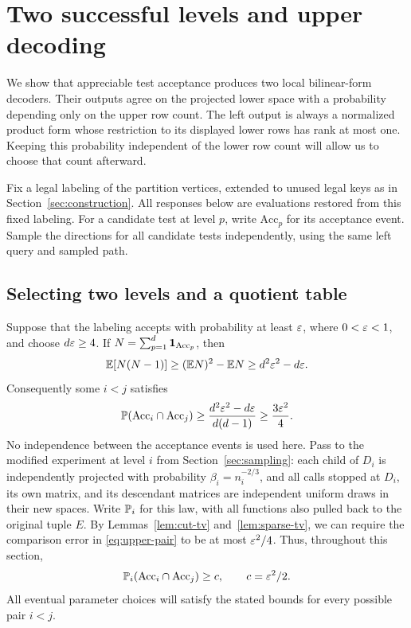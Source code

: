 \section{Two successful levels and upper decoding}\label{sec:upper}

We show that appreciable test acceptance produces two local bilinear-form
decoders.  Their outputs agree on the projected lower space with a probability
depending only on the upper row count.  The left output is always a normalized
product form whose restriction to its displayed lower rows has rank at most
one.  Keeping this probability independent of the lower row count will allow
us to choose that count afterward.

Fix a legal labeling of the partition vertices, extended to unused legal keys
as in Section~\ref{sec:construction}.  All responses below are evaluations
restored from this fixed labeling.  For a candidate test at level $p$, write
$\mathrm{Acc}_p$ for its acceptance event.  Sample the directions for all candidate
tests independently, using the same left query and sampled path.

\subsection{Selecting two levels and a quotient table}

Suppose that the labeling accepts with probability at least $\varepsilon$, where
$0<\varepsilon<1$, and choose $d\varepsilon\ge4$.  If
$N=\sum_{p=1}^d\mathbf 1_{\mathrm{Acc}_p}$, then
\[
 \mathbb E[N(N-1)]\ge (\mathbb E N)^2-\mathbb E N
       \ge d^2\varepsilon^2-d\varepsilon.
\]
Consequently some $i<j$ satisfies
\begin{equation}\label{eq:upper-pair}
 \mathbb P(\mathrm{Acc}_i\cap \mathrm{Acc}_j)
 \ge \frac{d^2\varepsilon^2-d\varepsilon}{d(d-1)}
 \ge \frac{3\varepsilon^2}{4}.
\end{equation}
No independence between the acceptance events is used here.  Pass to the
modified experiment at level $i$ from Section~\ref{sec:sampling}: each child
of $D_i$ is independently projected with probability $\beta_i=n_i^{-2/3}$,
and all calls stopped at $D_i$, its own matrix, and its descendant matrices
are independent uniform draws in their new spaces.  Write $\mathbb P_i$ for
this law, with all functions also pulled back to the original tuple $E$.
By Lemmas~\ref{lem:cut-tv} and~\ref{lem:sparse-tv}, we can require the
comparison error in \eqref{eq:upper-pair} to be at most $\varepsilon^2/4$.
Thus, throughout this section,
\begin{equation}\label{eq:upper-c}
 \mathbb P_i(\mathrm{Acc}_i\cap \mathrm{Acc}_j)\ge c,\qquad c=\varepsilon^2/2.
\end{equation}
All eventual parameter choices will satisfy the stated bounds for every
possible pair $i<j$.

